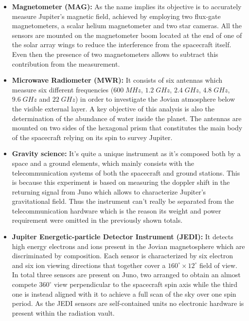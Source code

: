 \begin{itemize}
    \item \textbf{Magnetometer (MAG):} As the name implies its objective is to accurately measure Jupiter's magnetic field, achieved by employing two flux-gate magnetometers, a scalar helium magnetometer and two star cameras. All the sensors are mounted on the magnetometer boom located at the end of one of the solar array wings to reduce the interference from the spacecraft itself. Even then the presence of two magnetometers allows to subtract this contribution from the measurement.
    
    \item \textbf{Microwave Radiometer (MWR):} It consists of six antennas which measure six different frequencies ($600 \;MHz$, $1.2 \;GHz$, $2.4 \;GHz$, $4.8 \;GHz$, $9.6 \;GHz$ and $22 \;GHz$) in order to investigate the Jovian atmosphere below the visible external layer. A key objective of this analysis is also the determination of the abundance of water inside the planet. The antennas are mounted on two sides of the hexagonal prism that constitutes the main body of the spacecraft relying on its spin to survey Jupiter.
    
    \item \textbf{Gravity science:} It's quite a unique instrument as it's composed both by a space and a ground elements, which mainly consists with the telecommunication systems of both the spacecraft and ground stations. This is because this experiment is based on measuring the doppler shift in the returning signal from Juno which allows to characterize Jupiter's gravitational field. Thus the instrument can't really be separated from the telecommunication hardware which is the reason its weight and power requirement were omitted in the previously shown totals.
    
    \item \textbf{Jupiter Energetic-particle Detector Instrument (JEDI):} It detects high energy electrons and ions present in the Jovian magnetosphere which are discriminated by composition. Each sensor is characterized by six electron and six ion viewing directions that together cover a $160^{\circ} \times 12^{\circ}$ field of view. In total three sensors are present on Juno, two arranged to obtain an almost compete $360^{\circ}$ view perpendicular to the spacecraft spin axis while the third one is instead aligned with it to achieve a full scan of the sky over one spin period. As the JEDI sensors are self-contained units no electronic hardware is present within the radiation vault.


\end{itemize}
